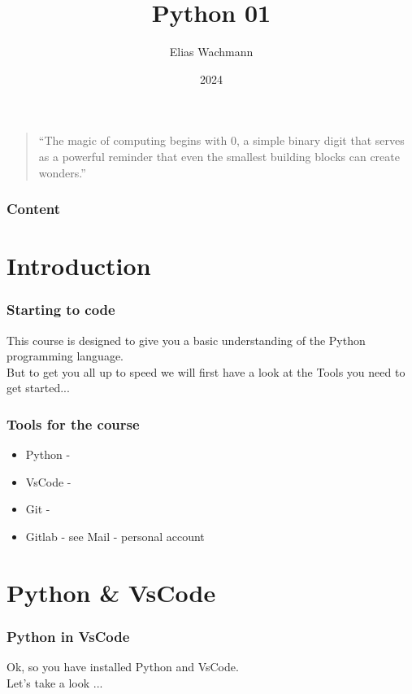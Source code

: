 \documentclass{beamer}
\title[]
{Python 01}
\author[E.~Wachmann]{\scriptsize Elias Wachmann
}
\date{2024} %
\institute[Institute of Theoretical and Computational Physics]
{
}
\begin{document}
\titleframe


\begin{frame}
  \vspace*{\fill}
  \begin{center}
    \begin{quote}
        ``The magic of computing begins with 0, a simple binary digit that serves as a powerful reminder that even the smallest building blocks can create wonders.''
    \end{quote}
\end{center}
\vspace*{\fill}
\end{frame}

\begin{frame}
\frametitle{Content}
  \tableofcontents
\end{frame}

\section{Introduction}
\begin{frame}
  \frametitle{Starting to code}
  This course is designed to give you a basic understanding of the Python programming language.\\
  But to get you all up to speed we will first have a look at the Tools you need to get started...\\
\end{frame}

\begin{frame}
  \frametitle{Tools for the course}
  \begin{itemize}
    \item Python - 
    \item VsCode - 
    \item Git - 
    \item Gitlab - see Mail - personal account
  \end{itemize}
\end{frame}

\section{Python \& VsCode}
\begin{frame}
  \frametitle{Python in VsCode}
  Ok, so you have installed Python and VsCode.\\
  \vspace{5mm}  
  Let's take a look ...\\
\end{frame}
\end{document}
